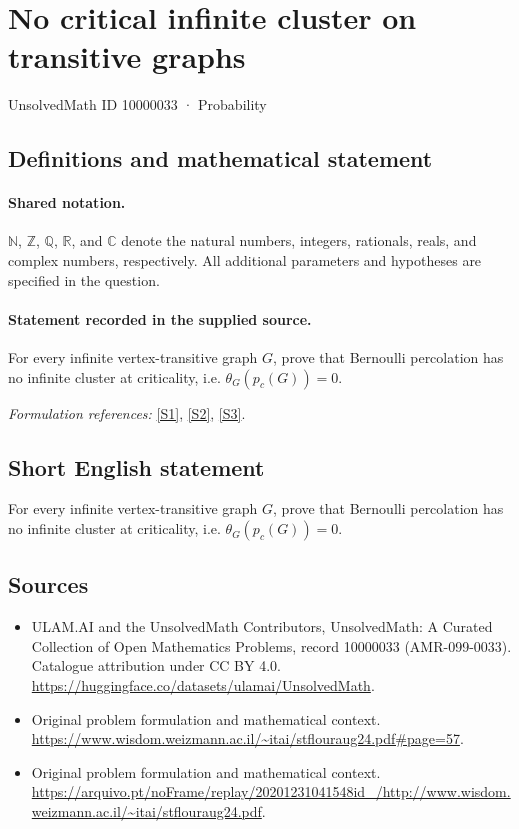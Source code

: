 \documentclass[11pt]{article}
\newcommand{\sref}[2]{\hyperlink{source:#1:#2}{[S#2]}}
\begin{document}
\setcounter{section}{10000032}
\section{No critical infinite cluster on transitive graphs}\label{10000033}
{\small UnsolvedMath ID 10000033 · Probability}
\subsection{Definitions and mathematical statement}

\paragraph{Shared notation.}$\mathbb N$, $\mathbb Z$, $\mathbb Q$, $\mathbb R$, and $\mathbb C$ denote the natural numbers, integers, rationals, reals, and complex numbers, respectively. All additional parameters and hypotheses are specified in the question.


\paragraph{Statement recorded in the supplied source.}
For every infinite vertex-transitive graph $G$, prove that Bernoulli percolation has no infinite cluster at criticality, i.e. $\theta_G(p_c(G))=0$.
\par\smallskip\textit{Formulation references:} \sref{10000033}{1}, \sref{10000033}{2}, \sref{10000033}{3}.
\subsection{Short English statement}
For every infinite vertex-transitive graph $G$, prove that Bernoulli percolation has no infinite cluster at criticality, i.e. $\theta_G(p_c(G))=0$.
\subsection{Sources}
\begin{itemize}
\item[\hypertarget{source:10000033:1}{S1}] ULAM.AI and the UnsolvedMath Contributors, UnsolvedMath: A Curated Collection of Open Mathematics Problems, record 10000033 (AMR-099-0033). Catalogue attribution under CC BY 4.0.
\url{https://huggingface.co/datasets/ulamai/UnsolvedMath}.
\item[\hypertarget{source:10000033:2}{S2}] Original problem formulation and mathematical context.
\url{https://www.wisdom.weizmann.ac.il/~itai/stflouraug24.pdf#page=57}.
\item[\hypertarget{source:10000033:3}{S3}] Original problem formulation and mathematical context.
\url{https://arquivo.pt/noFrame/replay/20201231041548id_/http://www.wisdom.weizmann.ac.il/~itai/stflouraug24.pdf}.
\end{itemize}
\label{end:10000033}
\end{document}
